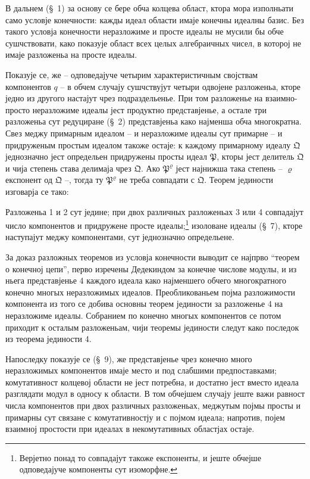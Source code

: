 ﻿\documentclass[11pt]{article}
\newcommand{\ideal}[1]{\mathfrak{#1}}
\begin{document}
В дальнем (\S~1) за основу се бере обча колцева област, ктора мора изполньати само условје конечности: кажды идеал области имаје конечны идеалны базис. Без такого условја конечности неразложиме и просте идеалы не мусили бы обче сушчствовати, како показује област всех целых алгебраичных чисел, в которој не имаје разложеньа на просте идеалы.

Показује се, же -- одповедајуче четырим характеристичным својствам компонентов \(q\) -- в обчем случају сушчствујут четыри одвојене разложеньа, кторе једно из другого настајут чрез подраздельенье. При том разложенье на взаимно-просто неразложиме идеалы јест продуктно представјенье, а остале три разложеньа сут редуциране (\S~2) представјеньа како најменша обча многократна. Свез меджу примарным идеалом -- и неразложиме идеалы сут примарне -- и придруженым простым идеалом такоже остаје: к каждому примарному идеалу \(\ideal Q\) једнозначно јест определьен придружены просты идеал \(\ideal P\), кторы јест делитель \(\ideal Q\) и чија степень става делимаја чрез \(\ideal Q\). Ако \(\ideal P^\varrho\) јест најнижша така степень -- \(\varrho\) експонент од \(\ideal Q\) --, тогда ту \(\ideal P^\varrho\) не треба совпадати с \(\ideal Q\). Теорем јединости изговарја се тако:

Разложеньа 1 и 2 сут једине; при двох различных разложеньах 3 или 4 совпадајут число компонентов и придружене просте идеалы;\footnote{Верјетно понад то совпадајут такоже експоненты, и јеште обчејше одповедајуче компоненты сут изоморфне.} изоловане идеалы (\S~7), кторе наступајут меджу компонентами, сут једнозначно определьене.

За доказ разложных теоремов из условја конечности выводит се најпрво ``теорем о конечној цепи'', перво изречены Дедекиндом за конечне числове модулы, и из ньега представјенье 4 каждого идеала како најменшего обчего многократного конечно многых неразложимых идеалов. Преобликованьем појма разложимости компонента из того се добива основны теорем јединости за разложенье 4 на неразложиме идеалы. Собранием по конечно многых компонентов се потом приходит к осталым разложеньам, чији теоремы јединости следут како последок из теорема јединости 4.

Напоследку показује се (\S~9), же представјенье чрез конечно много неразложимых компонентов имаје место и под слабшими предпоставками; комутативност колцевој области не јест потребна, и достатно јест вместо идеала разглядати модул в односу к области. В том обчејшем случају јеште важи равност числа компонентов при двох различных разложеньах, меджутым појмы просты и примарны сут связане с комутативностју и с појмом идеала; напротив, појем взаимној простости при идеалах в некомутативных областјах остаје.
\end{document}
